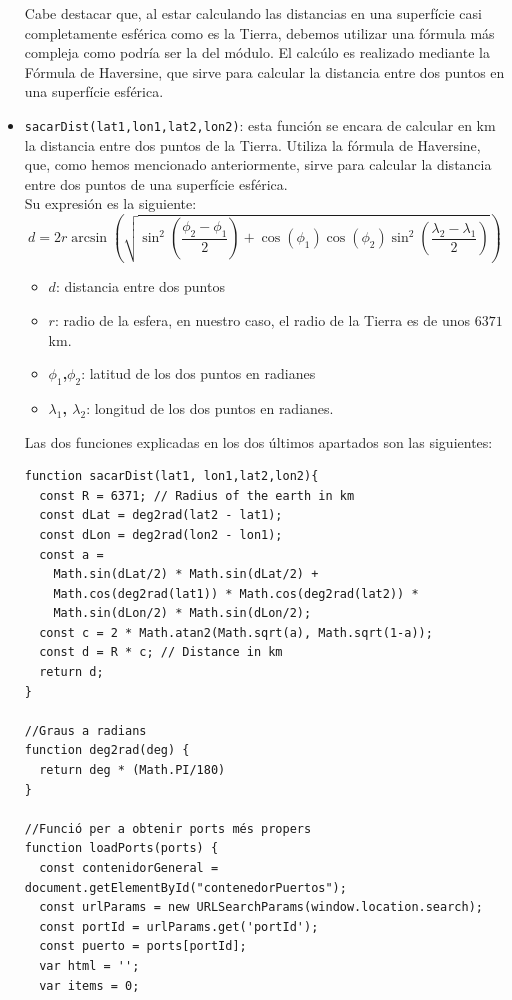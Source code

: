 \documentclass{article}
\begin{document}
\begin{itemize}
    Cabe destacar que, al estar calculando las distancias en una superfície casi completamente esférica como es la Tierra, debemos utilizar una fórmula más compleja como podría ser la del módulo. El calcúlo es realizado mediante la Fórmula de Haversine, que sirve para calcular la distancia entre dos puntos en una superfície esférica.
    
    \item \texttt{sacarDist(lat1,lon1,lat2,lon2)}: esta función se encara de calcular en km la distancia entre dos puntos de la Tierra. Utiliza la fórmula de Haversine, que, como hemos mencionado anteriormente, sirve para calcular la distancia entre dos puntos de una superfície esférica.\\Su expresión es la siguiente:
    \begin{equation*}
        d = 2r \arcsin\left(\sqrt{\sin^2\left(\frac{\phi_2-\phi_1}{2}\right) + \cos(\phi_1) \cos(\phi_2) \sin^2\left(\frac{\lambda_2-\lambda_1}{2}\right)}\right)
    \end{equation*}
    \begin{itemize}
        \item \textbf{$d$}: distancia entre dos puntos
        \item \textbf{$r$}: radio de la esfera, en nuestro caso, el radio de la Tierra es de unos $6371$km.
        \item \textbf{$\phi_1$,$\phi_2$}: latitud de los dos puntos en radianes
        \item \textbf{$\lambda_1$, $\lambda_2$}: longitud de los dos puntos en radianes.
    \end{itemize}
    Las dos funciones explicadas en los dos últimos apartados son las siguientes:
    \begin{verbatim}
function sacarDist(lat1, lon1,lat2,lon2){
  const R = 6371; // Radius of the earth in km
  const dLat = deg2rad(lat2 - lat1);
  const dLon = deg2rad(lon2 - lon1); 
  const a = 
    Math.sin(dLat/2) * Math.sin(dLat/2) +
    Math.cos(deg2rad(lat1)) * Math.cos(deg2rad(lat2)) * 
    Math.sin(dLon/2) * Math.sin(dLon/2); 
  const c = 2 * Math.atan2(Math.sqrt(a), Math.sqrt(1-a)); 
  const d = R * c; // Distance in km
  return d;
}

//Graus a radians
function deg2rad(deg) {
  return deg * (Math.PI/180)
}

//Funció per a obtenir ports més propers
function loadPorts(ports) {
  const contenidorGeneral = document.getElementById("contenedorPuertos");
  const urlParams = new URLSearchParams(window.location.search);
  const portId = urlParams.get('portId');
  const puerto = ports[portId];
  var html = '';
  var items = 0;


\end{verbatim}
\end{itemize}
\end{document}
